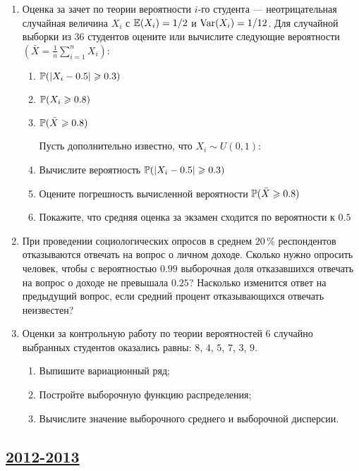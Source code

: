 \begin{enumerate}
\item Оценка за зачет по теории вероятности $i$-го студента — неотрицательная
случайная величина $X_i$ с $\E(X_i)=1/2$ и $\Var(X_i)=1/12$.
Для случайной выборки из $36$ студентов оцените или вычислите следующие вероятности
$\left(\bar{X} = \frac{1}{n} \sum _{i=1}^n X_i \right)$:
\begin{enumerate}
\item $\P(|X_i-0.5|\geqslant 0.3)$
\item $\P(X_i\geqslant 0.8)$
\item $\P(\bar{X}\geqslant 0.8)$

Пусть дополнительно известно, что $X_i \sim U(0,1)$:
\item Вычислите вероятность $\P(|X_i-0.5|\geqslant 0.3)$
\item Оцените погрешность вычисленной вероятности $\P(\bar{X}\geqslant 0.8)$
\item Покажите, что средняя оценка за экзамен сходится по вероятности к $0.5$

\end{enumerate}

\item При проведении социологических опросов в среднем $20\,\%$ респондентов
отказываются отвечать на вопрос о личном доходе. Сколько нужно опросить человек,
чтобы с вероятностью $0.99$ выборочная доля отказавшихся отвечать на вопрос о доходе
не превышала $0.25$? Насколько изменится ответ на предыдущий вопрос, если средний
процент отказывающихся отвечать неизвестен?

\item Оценки за контрольную работу по теории вероятностей $6$ случайно выбранных
студентов оказались равны: $8$, $4$, $5$, $7$, $3$, $9$.
\begin{enumerate}
\item Выпишите вариационный ряд;
\item Постройте выборочную функцию распределения;
\item Вычислите значение выборочного среднего и выборочной дисперсии.
\end{enumerate}
\end{enumerate}



\newpage
\subsection[2012-2013]{\hyperref[sec:sol_kr_02_2012_2013]{2012-2013}}
\label{sec:kr_02_2012_2013}

